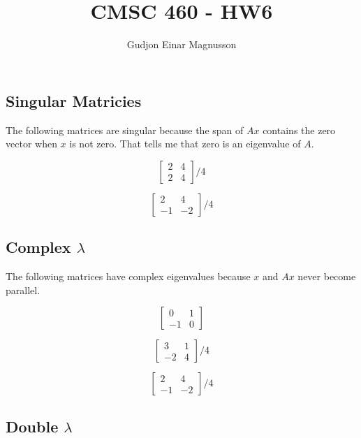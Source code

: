 \documentclass[12pt]{article}
\begin{document}
\title{CMSC 460 - HW6}
\author{Gudjon Einar Magnusson}

\maketitle

\section{}

\subsection{Singular Matricies}

The following matrices are singular because the span of $Ax$ contains the zero vector when $x$ is not zero. That tells me that zero is an eigenvalue of $A$.

\[
\begin{bmatrix}
    2 & 4 \\
    2 & 4
\end{bmatrix} /4
\]

\[
\begin{bmatrix}
    2 & 4 \\
    -1 & -2
\end{bmatrix} /4
\]

\subsection{Complex $\lambda$}

The following matrices have complex eigenvalues because $x$ and $Ax$ never become parallel.

\[
\begin{bmatrix}
    0 & 1 \\
    -1 & 0
\end{bmatrix}
\]

\[
\begin{bmatrix}
    3 & 1 \\
    -2 & 4
\end{bmatrix} / 4
\]

\[
\begin{bmatrix}
    2 & 4 \\
    -1 & -2
\end{bmatrix} /4
\]

\subsection{Double $\lambda$}
\end{document}
